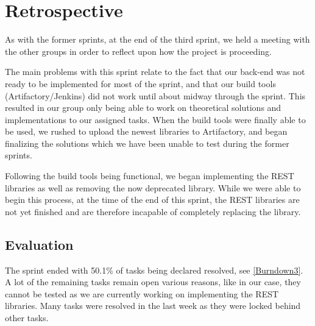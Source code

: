 \section{Retrospective}
As with the former sprints, at the end of the third sprint, we held a meeting
with the other groups in order to reflect upon how the project is proceeding.\nl

The main problems with this sprint relate to the fact that our back-end was not
ready to be implemented for most of the sprint, and that our build tools
(Artifactory/Jenkins) did not work until about midway through the sprint.
This resulted in our group only being able to work on theoretical solutions and
implementations to our assigned tasks. When the build tools were finally able to
be used, we rushed to upload the newest libraries to Artifactory, and began
finalizing the solutions which we have been unable to test during the former
sprints.\nl

Following the build tools being functional, we began implementing the REST
libraries as well as removing the now deprecated  library. While
we were able to begin this process, at the time of the end of this sprint, the
REST libraries are not yet finished and are therefore incapable of completely
replacing the  library.

\subsection{Evaluation}
The sprint ended with 50.1\% of tasks being declared resolved, see
\autoref{Burndown3}. A lot of the remaining tasks remain open various reasons,
like in our case, they cannot be tested as we are currently working on
implementing the REST libraries. Many tasks were resolved in the last week as
they were locked behind other tasks.


